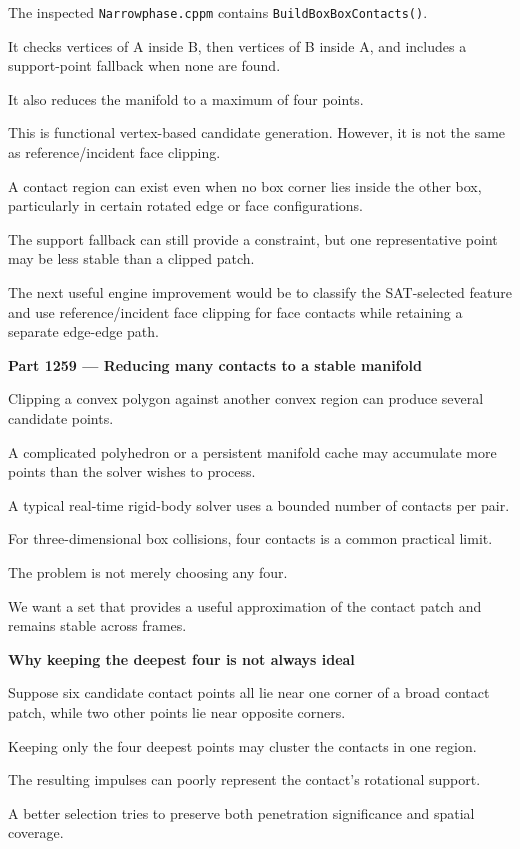 The inspected \texttt{Narrowphase.cppm} contains \texttt{BuildBoxBoxContacts()}.

It checks vertices of A inside B, then vertices of B inside A, and includes a support-point fallback when none are found.

It also reduces the manifold to a maximum of four points.

This is functional vertex-based candidate generation. However, it is not the same as reference/incident face clipping.

A contact region can exist even when no box corner lies inside the other box, particularly in certain rotated edge or face configurations.

The support fallback can still provide a constraint, but one representative point may be less stable than a clipped patch.

The next useful engine improvement would be to classify the SAT-selected feature and use reference/incident face clipping for face contacts while retaining a separate edge-edge path.

\textbf{Part 1259 --- Reducing many contacts to a stable manifold}

Clipping a convex polygon against another convex region can produce several candidate points.

A complicated polyhedron or a persistent manifold cache may accumulate more points than the solver wishes to process.

A typical real-time rigid-body solver uses a bounded number of contacts per pair.

For three-dimensional box collisions, four contacts is a common practical limit.

The problem is not merely choosing any four.

We want a set that provides a useful approximation of the contact patch and remains stable across frames.

\textbf{Why keeping the deepest four is not always ideal}

Suppose six candidate contact points all lie near one corner of a broad contact patch, while two other points lie near opposite corners.

Keeping only the four deepest points may cluster the contacts in one region.

The resulting impulses can poorly represent the contact's rotational support.

A better selection tries to preserve both penetration significance and spatial coverage.

